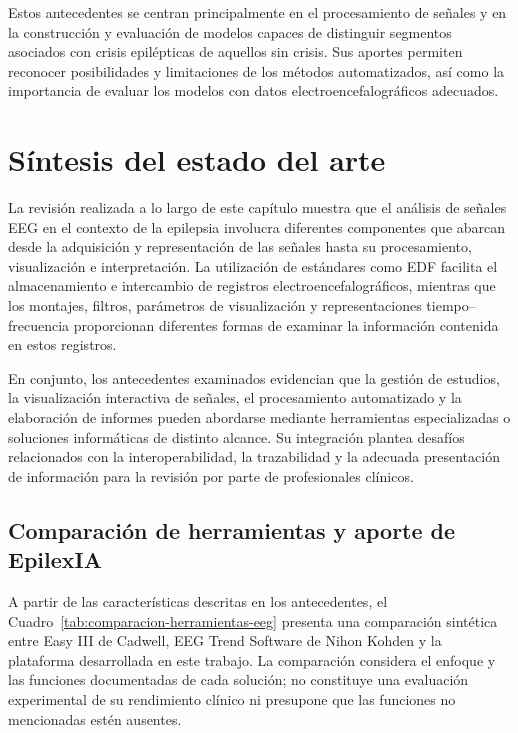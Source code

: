 Estos antecedentes se centran principalmente en el procesamiento de
señales y en la construcción y evaluación de modelos capaces de distinguir
segmentos asociados con crisis epilépticas de aquellos sin crisis. Sus
aportes permiten reconocer posibilidades y limitaciones de los métodos
automatizados, así como la importancia de evaluar los modelos con datos
electroencefalográficos adecuados.

\section{Síntesis del estado del arte}
\label{sec:sintesis-estado-arte}

La revisión realizada a lo largo de este capítulo muestra que el análisis de
señales EEG en el contexto de la epilepsia involucra diferentes componentes
que abarcan desde la adquisición y representación de las señales hasta su
procesamiento, visualización e interpretación. La utilización de estándares
como EDF facilita el almacenamiento e intercambio de registros
electroencefalográficos, mientras que los montajes, filtros, parámetros de
visualización y representaciones tiempo--frecuencia proporcionan diferentes
formas de examinar la información contenida en estos registros.

En conjunto, los antecedentes examinados evidencian que la gestión de
estudios, la visualización interactiva de señales, el procesamiento
automatizado y la elaboración de informes pueden abordarse mediante
herramientas especializadas o soluciones informáticas de distinto alcance.
Su integración plantea desafíos relacionados con la interoperabilidad,
la trazabilidad y la adecuada presentación de información para la revisión
por parte de profesionales clínicos.

\subsection{Comparación de herramientas y aporte de EpilexIA}
\label{subsec:comparacion-herramientas-epilexia}

A partir de las características descritas en los antecedentes, el
Cuadro~\ref{tab:comparacion-herramientas-eeg} presenta una comparación
sintética entre Easy III de Cadwell, EEG Trend Software de Nihon
Kohden y la plataforma desarrollada en este trabajo. La comparación
considera el enfoque y las funciones documentadas de cada solución;
no constituye una evaluación experimental de su rendimiento clínico
ni presupone que las funciones no mencionadas estén ausentes.

